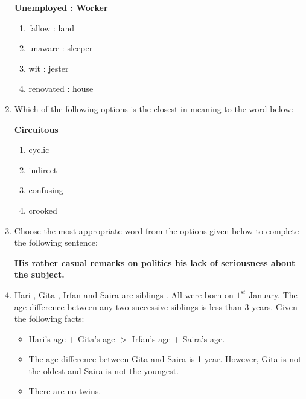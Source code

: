 \documentclass[journal,12pt,onecolumn]{IEEEtran}
\theoremstyle{remark}
\begin{document}
\begin{enumerate}
\textbf{Unemployed : Worker}

\hfill{}
\begin{enumerate}
    \item fallow : land
    \item unaware : sleeper
    \item wit : jester
    \item renovated : house
\end{enumerate}



\item Which of the following options is the closest in meaning to the word below: 

\textbf{Circuitous}

\hfill{}\begin{enumerate}
    \item cyclic
    \item indirect
    \item confusing
    \item crooked
\end{enumerate}

\item Choose the most appropriate word from the options given below to complete the following sentence:

\textbf{His rather casual remarks on politics \underline{\hspace{2cm}} his lack of seriousness about the subject.}

\hfill{}
\begin{enumerate}  \end{enumerate}



\item Hari , Gita , Irfan  and Saira  are siblings . All were born on $1^{st}$ January. The age difference between any two successive siblings  is less than 3 years. Given the following facts:

\begin{itemize}
    \item Hari's age + Gita's age $>$ Irfan's age + Saira's age.
    \item The age difference between Gita and Saira is 1 year. However, Gita is not the oldest and Saira is not the youngest.
    \item There are no twins. 
\end{itemize}


\end{enumerate}
\end{document}

